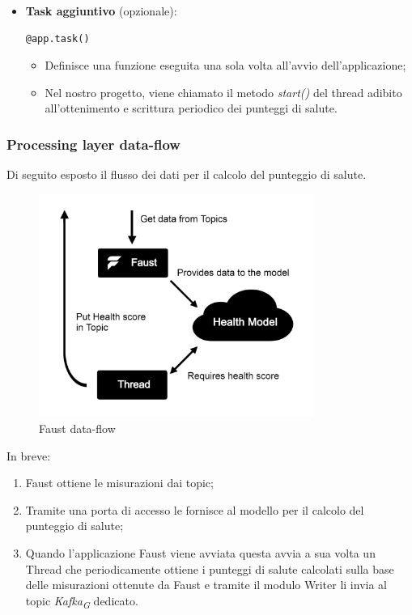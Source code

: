 \begin{itemize}
    \item \textbf{Task aggiuntivo} (opzionale): 
    \begin{lstlisting}[style=code]
    @app.task()
        \end{lstlisting}  
    \begin{itemize}
        \item Definisce una funzione eseguita una sola volta all'avvio dell'applicazione;
        \item Nel nostro progetto, viene chiamato il metodo \textit{start()} del thread adibito all'ottenimento e scrittura periodico dei punteggi di salute.
    \end{itemize}
\end{itemize}

\subsubsection{Processing layer data-flow}
Di seguito esposto il flusso dei dati per il calcolo del punteggio di salute.

\begin{figure}[H]
    \centering
    \includegraphics[width=0.8\textwidth]{../Images/SpecificaTecnica/faustFlow.png}
    \caption{Faust data-flow}
    \label{fig: FaustDataflow}
\end{figure}
In breve:
\begin{enumerate}
    \item Faust ottiene le misurazioni dai topic;
    \item Tramite una porta di accesso le fornisce al modello per il calcolo del punteggio di salute;
    \item Quando l'applicazione Faust viene avviata questa avvia a sua volta un Thread che periodicamente ottiene i punteggi di salute calcolati sulla base delle misurazioni ottenute da Faust e tramite il modulo Writer li invia al topic \textit{Kafka}\textsubscript{\textit{G}} dedicato.
\end{enumerate}

